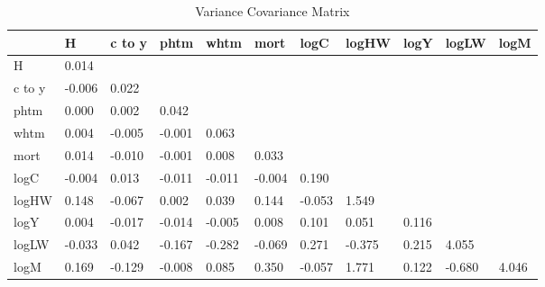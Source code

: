 \begin{table}[htbp]
\caption{\label{clabel} Variance Covariance Matrix}\centering\medskip
\begin{tabular}{lllllllllll} \hline \hline
 & H  & c to y  & phtm  & whtm  & mort  & logC  & logHW  & logY  & logLW  & logM  \\  \hline 
H &     0.014 \\  
c to y &    -0.006 &     0.022 \\  
phtm &     0.000 &     0.002 &     0.042 \\  
whtm &     0.004 &    -0.005 &    -0.001 &     0.063 \\  
mort &     0.014 &    -0.010 &    -0.001 &     0.008 &     0.033 \\  
logC &    -0.004 &     0.013 &    -0.011 &    -0.011 &    -0.004 &     0.190 \\  
logHW &     0.148 &    -0.067 &     0.002 &     0.039 &     0.144 &    -0.053 &     1.549 \\  
logY &     0.004 &    -0.017 &    -0.014 &    -0.005 &     0.008 &     0.101 &     0.051 &     0.116 \\  
logLW &    -0.033 &     0.042 &    -0.167 &    -0.282 &    -0.069 &     0.271 &    -0.375 &     0.215 &     4.055 \\  
logM &     0.169 &    -0.129 &    -0.008 &     0.085 &     0.350 &    -0.057 &     1.771 &     0.122 &    -0.680 &     4.046 \\  
\hline \hline \end{tabular}
\end{table}
